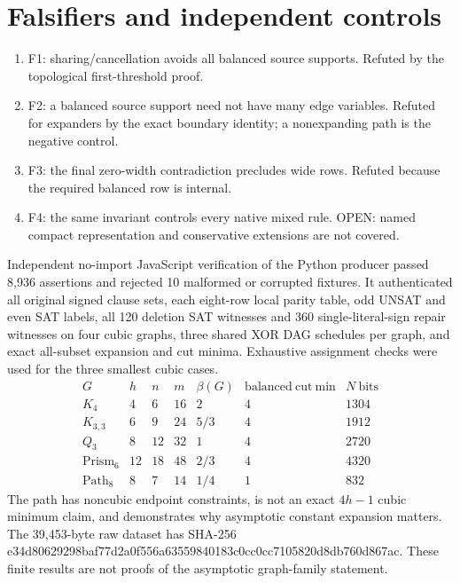 \documentclass[11pt]{article}
\begin{document}
\section*{Falsifiers and independent controls}
\begin{enumerate}
\item[] F1: sharing/cancellation avoids all balanced source supports. Refuted by the topological first-threshold proof.
\item[] F2: a balanced source support need not have many edge variables. Refuted for expanders by the exact boundary identity; a nonexpanding path is the negative control.
\item[] F3: the final zero-width contradiction precludes wide rows. Refuted because the required balanced row is internal.
\item[] F4: the same invariant controls every native mixed rule. OPEN: named compact representation and conservative extensions are not covered.
\end{enumerate}
Independent no-import JavaScript verification of the Python producer passed 8,936 assertions and rejected 10 malformed or corrupted fixtures. It authenticated all original signed clause sets, each eight-row local parity table, odd UNSAT and even SAT labels, all 120 deletion SAT witnesses and 360 single-literal-sign repair witnesses on four cubic graphs, three shared XOR DAG schedules per graph, and exact all-subset expansion and cut minima. Exhaustive assignment checks were used for the three smallest cubic cases.
\[
\begin{array}{l|rrrrrr}
G&h&n&m&\beta(G)&\mathrm{balanced\ cut\ min}&N\ \mathrm{bits}\\\hline
K_4&4&6&16&2&4&1304\\
K_{3,3}&6&9&24&5/3&4&1912\\
Q_3&8&12&32&1&4&2720\\
\mathrm{Prism}_6&12&18&48&2/3&4&4320\\
\mathrm{Path}_8&8&7&14&1/4&1&832
\end{array}
\]
The path has noncubic endpoint constraints, is not an exact $4h-1$ cubic minimum claim, and demonstrates why asymptotic constant expansion matters. The 39,453-byte raw dataset has SHA-256 e34d80629298baf77d2a0f556a63559840183c0cc0cc7105820d8db760d867ac. These finite results are not proofs of the asymptotic graph-family statement.
\end{document}
